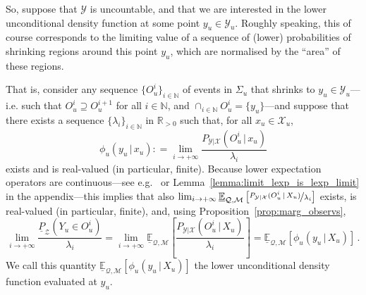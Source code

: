 \documentclass[3p]{elsarticle}
\newcommand{\nats}{\mathbb{N}}
\newcommand{\reals}{\mathbb{R}}
\newcommand{\realspos}{\reals_{>0}}
\newcommand{\states}{\mathcal{X}}
\newcommand{\observs}{\mathcal{Y}}
\newcommand{\rateset}{\mathcal{Q}}
\newcommand{\coloneqq}{:\!=}
\begin{document}

So, suppose that $\observs$ is uncountable, and that we are interested in the lower unconditional density function at some point $y_u\in\observs_u$. Roughly speaking, this of course corresponds to the limiting value of a sequence of (lower) probabilities of shrinking regions around this point $y_u$, which are normalised by the ``area'' of these regions.

That is, consider any sequence $\{O_u^i\}_{i\in\nats}$ of events in $\Sigma_u$ that shrinks to $y_u\in\observs_u$---i.e. such that $O_u^i\supseteq O_u^{i+1}$ for all $i\in\nats$, and $\cap_{i\in\nats}O_u^i=\{y_u\}$---and suppose that there exists a sequence $\{\lambda_i\}_{i\in\nats}$ in $\realspos$ such that, for all $x_u\in\states_u$,
\begin{equation}\label{eq:first_def_derived_density}
\phi_u(y_u\,\vert\,x_u) \coloneqq \lim_{i\to+\infty}\frac{P_{\observs\vert\states}(O_u^i\,\vert\,x_u)}{\lambda_i}
\end{equation}
exists and is real-valued (in particular, finite). Because lower expectation operators are continuous---see e.g.~\cite[Proposition 2.6.1.$\ell$]{Walley:1991vk} or Lemma~\ref{lemma:limit_lexp_is_lexp_limit} in the appendix---this implies that also $\lim_{i\to+\infty} \underline{\mathbb{E}}_{\rateset,\mathcal{M}}\left[\nicefrac{P_{\observs\vert\states}(O_u^i\,\vert\,X_u)}{\lambda_i}\right]$ 
exists, is real-valued (in particular, finite), and, using Proposition~\ref{prop:marg_observs},
\begin{equation*}
\lim_{i\to+\infty} \frac{\underline{P}_\mathcal{Z}(Y_u\in O_u^i)}{\lambda_i} = \lim_{i\to+\infty} \underline{\mathbb{E}}_{\rateset,\mathcal{M}}\left[\frac{P_{\observs\vert\states}(O_u^i\,\vert\,X_u)}{\lambda_i}\right] = \underline{\mathbb{E}}_{\rateset,\mathcal{M}}\left[\phi_u(y_u\,\vert\,X_u)\right]\,.
\end{equation*}
We call this quantity $\underline{\mathbb{E}}_{\rateset,\mathcal{M}}\left[\phi_u(y_u\,\vert\,X_u)\right]$ the lower unconditional density function evaluated at $y_u$.
\end{document}
